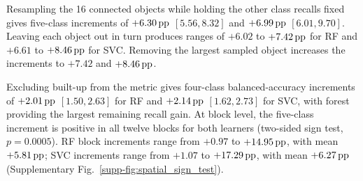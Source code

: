 Resampling the 16 connected objects while holding the other class recalls fixed gives five-class increments of $+6.30\,\mathrm{pp}$ $[5.56,8.32]$ and $+6.99\,\mathrm{pp}$ $[6.01,9.70]$. Leaving each object out in turn produces ranges of $+6.02$ to $+7.42\,\mathrm{pp}$ for RF and $+6.61$ to $+8.46\,\mathrm{pp}$ for SVC. Removing the largest sampled object increases the increments to $+7.42$ and $+8.46\,\mathrm{pp}$.

Excluding built-up from the metric gives four-class balanced-accuracy increments of $+2.01\,\mathrm{pp}$ $[1.50,2.63]$ for RF and $+2.14\,\mathrm{pp}$ $[1.62,2.73]$ for SVC, with forest providing the largest remaining recall gain. At block level, the five-class increment is positive in all twelve blocks for both learners (two-sided sign test, $p=0.0005$). RF block increments range from $+0.97$ to $+14.95\,\mathrm{pp}$, with mean $+5.81\,\mathrm{pp}$; SVC increments range from $+1.07$ to $+17.29\,\mathrm{pp}$, with mean $+6.27\,\mathrm{pp}$ (Supplementary Fig.~\ref{supp-fig:spatial_sign_test}).

